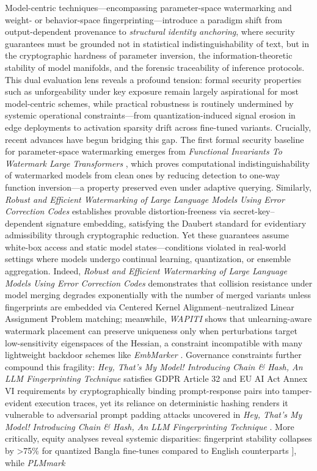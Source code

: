 \documentclass[11pt,a4paper]{article}
\begin{document}
Model-centric techniques---encompassing parameter-space watermarking and weight- or behavior-space fingerprinting---introduce a paradigm shift from output-dependent provenance to \emph{structural identity anchoring}, where security guarantees must be grounded not in statistical indistinguishability of text, but in the cryptographic hardness of parameter inversion, the information-theoretic stability of model manifolds, and the forensic traceability of inference protocols. This dual evaluation lens reveals a profound tension: formal security properties such as unforgeability under key exposure remain largely aspirational for most model-centric schemes, while practical robustness is routinely undermined by systemic operational constraints---from quantization-induced signal erosion in edge deployments to activation sparsity drift across fine-tuned variants. Crucially, recent advances have begun bridging this gap. The first formal security baseline for parameter-space watermarking emerges from \emph{Functional Invariants To Watermark Large Transformers} \cite{doi:10.3390/electronics14010025}, which proves computational indistinguishability of watermarked models from clean ones by reducing detection to one-way function inversion---a property preserved even under adaptive querying. Similarly, \emph{Robust and Efficient Watermarking of Large Language Models Using Error Correction Codes} \cite{doi:10.3390/electronics14010025} establishes provable distortion-freeness via secret-key--dependent signature embedding, satisfying the Daubert standard for evidentiary admissibility through cryptographic reduction. Yet these guarantees assume white-box access and static model states---conditions violated in real-world settings where models undergo continual learning, quantization, or ensemble aggregation. Indeed, \emph{Robust and Efficient Watermarking of Large Language Models Using Error Correction Codes} \cite{doi:10.3390/electronics14010025} demonstrates that collision resistance under model merging degrades exponentially with the number of merged variants unless fingerprints are embedded via Centered Kernel Alignment--neutralized Linear Assignment Problem matching; meanwhile, \emph{WAPITI} \cite{doi:10.3390/electronics14010025} shows that unlearning-aware watermark placement can preserve uniqueness only when perturbations target low-sensitivity eigenspaces of the Hessian, a constraint incompatible with many lightweight backdoor schemes like \emph{EmbMarker} \cite{doi:10.3390/electronics14010025}. Governance constraints further compound this fragility: \emph{Hey, That's My Model! Introducing Chain \& Hash, An LLM Fingerprinting Technique} \cite{doi:10.3390/electronics14010025} satisfies GDPR Article 32 and EU AI Act Annex VI requirements by cryptographically binding prompt-response pairs into tamper-evident execution traces, yet its reliance on deterministic hashing renders it vulnerable to adversarial prompt padding attacks uncovered in \emph{Hey, That's My Model! Introducing Chain \& Hash, An LLM Fingerprinting Technique} \cite{doi:10.3390/electronics14010025}. More critically, equity analyses reveal systemic disparities: fingerprint stability collapses by >75\% for quantized Bangla fine-tunes compared to English counterparts \cite{arxiv:2402.14007}], while \emph{PLMmark} 
\end{document}
